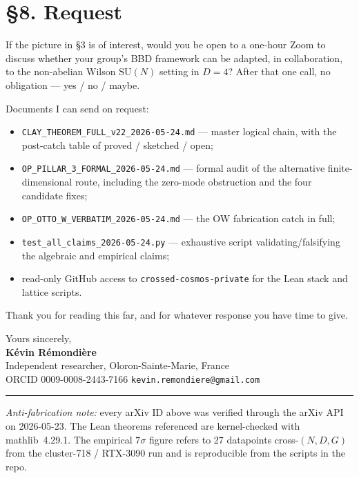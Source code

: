 \documentclass[11pt,a4paper]{article}
\newcommand{\SU}[1]{\mathrm{SU}(#1)}
\begin{document}
\section*{§8. Request}

If the picture in §3 is of interest, would you be open to a one-hour Zoom to discuss whether your group's BBD framework can be adapted, in collaboration, to the non-abelian Wilson $\SU{N}$ setting in $D=4$? After that one call, no obligation --- yes / no / maybe.

Documents I can send on request:
\begin{itemize}
  \item \texttt{CLAY\_THEOREM\_FULL\_v22\_2026-05-24.md} --- master logical chain, with the post-catch table of proved / sketched / open;
  \item \texttt{OP\_PILLAR\_3\_FORMAL\_2026-05-24.md} --- formal audit of the alternative finite-dimensional route, including the zero-mode obstruction and the four candidate fixes;
  \item \texttt{OP\_OTTO\_W\_VERBATIM\_2026-05-24.md} --- the OW fabrication catch in full;
  \item \texttt{test\_all\_claims\_2026-05-24.py} --- exhaustive script validating/falsifying the algebraic and empirical claims;
  \item read-only GitHub access to \texttt{crossed-cosmos-private} for the Lean stack and lattice scripts.
\end{itemize}

Thank you for reading this far, and for whatever response you have time to give.

\smallskip
Yours sincerely,\\[2pt]
\textbf{Kévin Rémondière}\\
Independent researcher, Oloron-Sainte-Marie, France\\
ORCID 0009-0008-2443-7166 \quad\textbar\quad \texttt{kevin.remondiere@gmail.com}

\smallskip
\hrule
\smallskip

{\footnotesize\emph{Anti-fabrication note:} every arXiv ID above was verified through the arXiv API on 2026-05-23. The Lean theorems referenced are kernel-checked with mathlib~4.29.1. The empirical $7\sigma$ figure refers to 27 datapoints cross-$(N, D, G)$ from the cluster-718 / RTX-3090 run and is reproducible from the scripts in the repo.}
\end{document}

